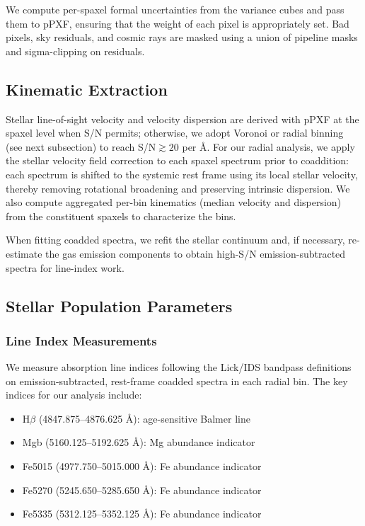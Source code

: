 \documentclass[linenumbers,trackchanges,twocolumn]{aastex631}
\begin{document}
We compute per-spaxel formal uncertainties from the variance cubes and pass them to pPXF, ensuring that the weight of each pixel is appropriately set. Bad pixels, sky residuals, and cosmic rays are masked using a union of pipeline masks and sigma-clipping on residuals.

\subsection{Kinematic Extraction}

Stellar line-of-sight velocity and velocity dispersion are derived with pPXF at the spaxel level when S/N permits; otherwise, we adopt Voronoi or radial binning (see next subsection) to reach S/N$\gtrsim20$ per \AA. For our radial analysis, we apply the stellar velocity field correction to each spaxel spectrum prior to coaddition: each spectrum is shifted to the systemic rest frame using its local stellar velocity, thereby removing rotational broadening and preserving intrinsic dispersion. We also compute aggregated per-bin kinematics (median velocity and dispersion) from the constituent spaxels to characterize the bins.

When fitting coadded spectra, we refit the stellar continuum and, if necessary, re-estimate the gas emission components to obtain high-S/N emission-subtracted spectra for line-index work.

\subsection{Stellar Population Parameters}

\subsubsection{Line Index Measurements}

We measure absorption line indices following the Lick/IDS bandpass definitions \citep{Worthey1994, Trager2000} on emission-subtracted, rest-frame coadded spectra in each radial bin. The key indices for our analysis include:
\begin{itemize}
\item H$\beta$ (4847.875--4876.625 \AA): age-sensitive Balmer line
\item Mgb (5160.125--5192.625 \AA): Mg abundance indicator
\item Fe5015 (4977.750--5015.000 \AA): Fe abundance indicator
\item Fe5270 (5245.650--5285.650 \AA): Fe abundance indicator
\item Fe5335 (5312.125--5352.125 \AA): Fe abundance indicator
\end{itemize}
\end{document}
